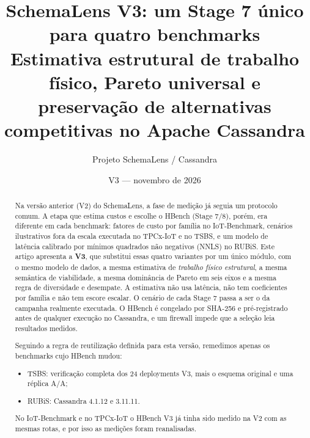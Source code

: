 \documentclass[10pt,a4paper,twoside]{article}
\title{\textbf{SchemaLens V3: um Stage 7 único para quatro benchmarks}\\[3pt]
\large Estimativa estrutural de trabalho físico, Pareto universal e preservação de alternativas competitivas no Apache Cassandra}
\author{Projeto SchemaLens / Cassandra}
\date{V3 --- novembro de 2026}
\theoremstyle{definition}\newtheorem{definicao}{Definição}
\begin{document}
\maketitle

\begin{abstract}
\noindent Na versão anterior (V2) do SchemaLens, a fase de medição já seguia um protocolo comum. A etapa que estima custos e
escolhe o HBench (Stage 7/8), porém, era diferente em cada benchmark: fatores de custo por família no IoT-Benchmark,
cenários ilustrativos fora da escala executada no TPCx-IoT e no TSBS, e um modelo de latência calibrado por mínimos
quadrados não negativos (NNLS) no RUBiS. Este artigo apresenta a \textbf{V3}, que substitui essas quatro variantes por um
único módulo, com o mesmo modelo de dados, a mesma estimativa de \emph{trabalho físico estrutural}, a mesma semântica de
viabilidade, a mesma dominância de Pareto em seis eixos e a mesma regra de diversidade e desempate. A estimativa não usa
latência, não tem coeficientes por família e não tem escore escalar. O cenário de cada Stage 7 passa a ser o da campanha
realmente executada. O HBench é congelado por SHA-256 e pré-registrado antes de qualquer execução no Cassandra, e um
firewall impede que a seleção leia resultados medidos.

\noindent Seguindo a regra de reutilização definida para esta versão, remedimos apenas os benchmarks cujo HBench mudou:
\begin{itemize}
\item TSBS: verificação completa dos 24 deployments V3, mais o esquema original e uma réplica A/A;
\item RUBiS: Cassandra 4.1.12 e 3.11.11.
\end{itemize}
No IoT-Benchmark e no TPCx-IoT o HBench V3 já tinha sido medido na V2 com as mesmas rotas, e por isso as medições foram reanalisadas.


\end{abstract}
\end{document}
